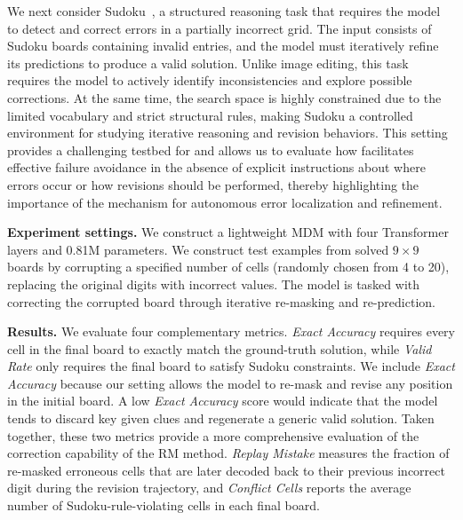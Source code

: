 We next consider Sudoku~\citep{palm2018recurrent,wang2019satnet}, a structured reasoning task that requires the model to detect and correct errors in a partially incorrect grid. The input consists of Sudoku boards containing invalid entries, and the model must iteratively refine its predictions to produce a valid solution. Unlike image editing, this task requires the model to actively identify inconsistencies and explore possible corrections. At the same time, the search space is highly constrained due to the limited vocabulary and strict structural rules, making Sudoku a controlled environment for studying iterative reasoning and revision behaviors. This setting provides a challenging testbed for \methodfull and allows us to evaluate how \temporalmethodfull facilitates effective failure avoidance in the absence of explicit instructions about where errors occur or how revisions should be performed, thereby highlighting the importance of the \temporalmethod mechanism for autonomous error localization and refinement.



\textbf{Experiment settings.}
We construct a lightweight MDM with four Transformer layers and 0.81M parameters. We construct test examples from solved $9\times9$ boards by corrupting a specified number of cells (randomly chosen from 4 to 20), replacing the original digits with incorrect values. The model is tasked with correcting the corrupted board through iterative re-masking and re-prediction.

\textbf{Results.}
We evaluate four complementary metrics.
\textit{Exact Accuracy} requires every cell in the final board to exactly match the ground-truth solution, while \textit{Valid Rate} only requires the final board to satisfy Sudoku constraints.
We include \textit{Exact Accuracy} because our setting allows the model to re-mask and revise any position in the initial board. A low \textit{Exact Accuracy} score would indicate that the model tends to discard key given clues and regenerate a generic valid solution. Taken together, these two metrics provide a more comprehensive evaluation of the correction capability of the RM method.
\textit{Replay Mistake} measures the fraction of re-masked erroneous cells that are later decoded back to their previous incorrect digit during the revision trajectory, and \textit{Conflict Cells} reports the average number of Sudoku-rule-violating cells in each final board.

